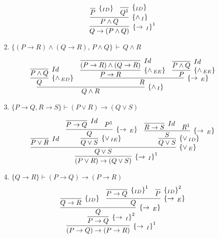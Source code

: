 \begin{enumerate}
\begin{enumerate}
	\[
		\infer[\impI^1]
			{Q\rightarrow(P\land Q)}
			{
				\infer[\andI]
					{P\land Q}
					{
						\infer[\Id]
							{P}
							{}
						&
						\infer[\Id]
							{Q^1}
							{}
					}
			}
	\]
	
	\item $\{(P\rightarrow R)\land (Q\rightarrow R),\, P\land Q\}\,\vdash\, Q\land R$
	
	\[
		\infer[\andI]
			{Q\land R}
			{
				\infer[\andED]
					{Q}
					{
						\infer[Id]
							{P \land Q}
							{}
					}
				&
				\infer[\impE]
					{R}
					{
						\infer[\andEE]
							{P \to R}
							{
								\infer[Id]
									{(P \to R)\land(Q \to R)}
									{}
							}
						&
						\infer[\andEE]
							{P}
							{
								\infer[Id]
									{P \land Q}
									{}
							}
					}
			}
	\]
	
	\item $\{P\rightarrow Q, R\rightarrow S\}\vdash (P\lor R)\rightarrow (Q\lor S)$
	
	\[
		\infer[\impI^1]
			{(P \lor R) \to (Q \lor S)}
			{
				\infer[\orE]
					{Q \lor S}
					{
						\infer[Id]
							{P \lor R}
							{} &
						\infer[\orIE]
							{Q \lor S }
							{
								\infer[\impE]
									{Q}
									{
										\infer[Id]
											{P \to Q}
											{}
										&
										P^1
									}
							} &
						\infer[\orID]
							{Q \lor S }
							{
								\infer[\impE]
									{S}
									{
										\infer[Id]
											{R \to S}
											{}
										&
										R^1
									}
							}
					}
			}
	\]
	\item $\{Q\rightarrow R\}\vdash (P\rightarrow Q)\rightarrow(P\rightarrow R)$
	\[
		\infer[\impI^1]
			{(P \to Q) \to (P \to R)}
			{
				\infer[\impI^2]
					{P \to Q}
					{
						\infer[\impE]
						{Q}
						{
							\infer[\Id]
								{Q \to R}
								{}
							&
							\infer[\impE]
								{Q}
								{
									\infer[\Id^1]
										{P \to Q}
										{}
									&
									\infer[\Id^2]
										{P}
										{}
								}
						}
					}
			}	
	\]
	

\end{enumerate}
\end{enumerate}
